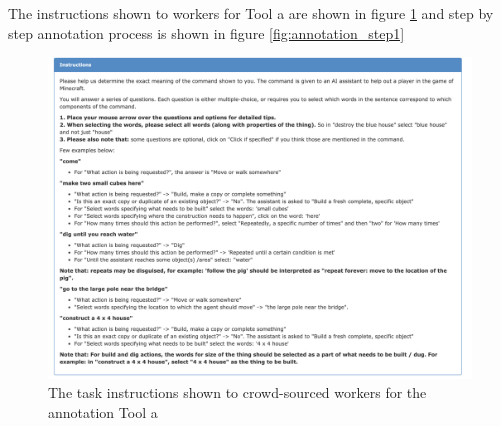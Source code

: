 The instructions shown to workers for Tool a are shown in figure \ref{fig:annotation_task1} and step by step annotation process is shown in figure \ref{fig:annotation_step1}
\label{sec:tool_a}
\begin{figure}
	\includegraphics[width=\linewidth ]{figures/11.png}
	\caption{The task instructions shown to crowd-sourced workers for the annotation Tool a}
	\label{fig:annotation_task1}
\end{figure}

